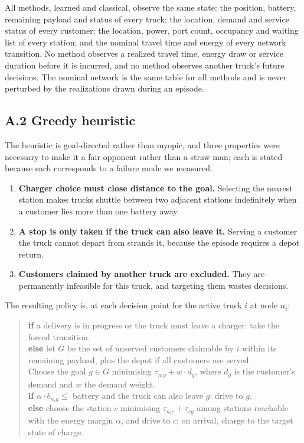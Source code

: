 \documentclass[journal]{IEEEtran}
\begin{document}
All methods, learned and classical, observe the same state: the position,
battery, remaining payload and status of every truck; the location, demand and
service status of every customer; the location, power, port count, occupancy and
waiting list of every station; and the nominal travel time and energy of every
network transition. No method observes a realized travel time, energy draw or
service duration before it is incurred, and no method observes another truck's
future decisions. The nominal network is the same table for all methods and is
never perturbed by the realizations drawn during an episode.

\subsection*{A.2 Greedy heuristic}

The heuristic is goal-directed rather than myopic, and three properties were
necessary to make it a fair opponent rather than a straw man; each is stated
because each corresponds to a failure mode we measured.

\begin{enumerate}[leftmargin=*,nosep]
\item \textbf{Charger choice must close distance to the goal.} Selecting the
nearest station makes trucks shuttle between two adjacent stations indefinitely
when a customer lies more than one battery away.
\item \textbf{A stop is only taken if the truck can also leave it.} Serving a
customer the truck cannot depart from strands it, because the episode requires a
depot return.
\item \textbf{Customers claimed by another truck are excluded.} They are
permanently infeasible for this truck, and targeting them wastes decisions.
\end{enumerate}

\noindent The resulting policy is, at each decision point for the active truck
$i$ at node $n_i$:

\begin{quote}
\small
\textbf{if} a delivery is in progress or the truck must leave a charger:
  take the forced transition.\\
\textbf{else} let $G$ be the set of unserved customers claimable by $i$ within
its remaining payload, plus the depot if all customers are served.\\
\quad Choose the goal $g\in G$ minimising
$\tau_{n_i g} + w\cdot d_g$, where $d_g$ is the customer's demand and $w$ the
demand weight.\\
\quad \textbf{if} $\alpha\cdot b_{n_i g} \le$ battery and the truck can also
leave $g$: drive to $g$.\\
\quad \textbf{else} choose the station $c$ minimising
$\tau_{n_i c} + \tau_{c g}$ among stations reachable with the energy margin
$\alpha$, and drive to $c$; on arrival, charge to the target state of charge.
\end{quote}
\end{document}
